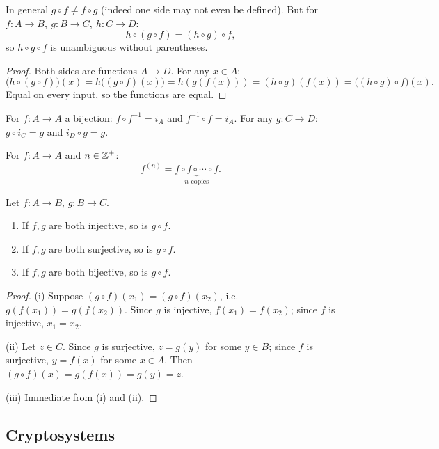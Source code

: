 \documentclass[11pt]{article}
\begin{document}
\begin{theorem}
In general $g \circ f \neq f \circ g$ (indeed one side may not even be defined). But for $f: A\to B,\ g: B\to C,\ h: C\to D$:
\[
h \circ (g \circ f) = (h \circ g) \circ f,
\]
so $h \circ g \circ f$ is unambiguous without parentheses.
\end{theorem}
\begin{proof}
Both sides are functions $A \to D$. For any $x \in A$:
\[
\big(h \circ (g \circ f)\big)(x) = h\big((g\circ f)(x)\big) = h(g(f(x))) = (h \circ g)(f(x)) = \big((h \circ g) \circ f\big)(x).
\]
Equal on every input, so the functions are equal.
\end{proof}

\begin{theorem}
For $f: A \to A$ a bijection: $f \circ f^{-1} = i_A$ and $f^{-1} \circ f = i_A$. For any $g: C \to D$: $g \circ i_C = g$ and $i_D \circ g = g$.
\end{theorem}

\begin{definition}
For $f: A \to A$ and $n \in \mathbb{Z}^+$:
\[
f^{(n)} = \underbrace{f \circ f \circ \cdots \circ f}_{n \text{ copies}}.
\]
\end{definition}

\begin{theorem}
Let $f: A \to B$, $g: B \to C$.
\begin{enumerate}[label=(\roman*)]
    \item If $f,g$ are both injective, so is $g \circ f$.
    \item If $f,g$ are both surjective, so is $g \circ f$.
    \item If $f,g$ are both bijective, so is $g \circ f$.
\end{enumerate}
\end{theorem}
\begin{proof}
(i) Suppose $(g\circ f)(x_1) = (g\circ f)(x_2)$, i.e.\ $g(f(x_1)) = g(f(x_2))$. Since $g$ is injective, $f(x_1) = f(x_2)$; since $f$ is injective, $x_1 = x_2$.

(ii) Let $z \in C$. Since $g$ is surjective, $z = g(y)$ for some $y \in B$; since $f$ is surjective, $y = f(x)$ for some $x \in A$. Then $(g\circ f)(x) = g(f(x)) = g(y) = z$.

(iii) Immediate from (i) and (ii).
\end{proof}

\subsection{Cryptosystems}
\label{sec:2-10}
\end{document}
